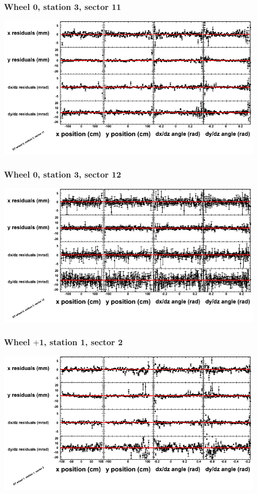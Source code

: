 \documentclass[compress]{beamer}
\begin{document}
\begin{frame}
\frametitle{Wheel 0, station 3, sector 11}
\includegraphics[width=\linewidth]{tmppoly_MBwhCst3sec11.png}
\end{frame}

\begin{frame}
\frametitle{Wheel 0, station 3, sector 12}
\includegraphics[width=\linewidth]{tmppoly_MBwhCst3sec12.png}
\end{frame}

\begin{frame}
\frametitle{Wheel $+$1, station 1, sector 2}
\includegraphics[width=\linewidth]{tmppoly_MBwhDst1sec02.png}
\end{frame}
\end{document}
